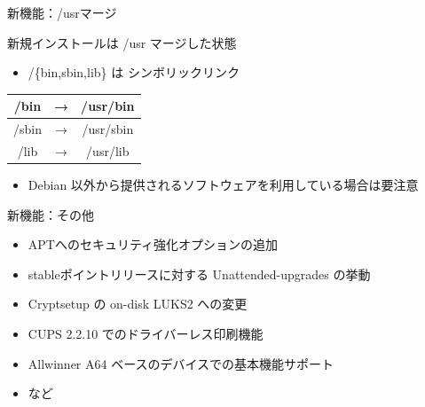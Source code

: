 \begin{frame}{新機能：/usrマージ}

新規インストールは /usr マージした状態

\begin{itemize}
  \item /\{bin,sbin,lib\} は シンボリックリンク
\end{itemize}

\begin{table}[htb]
  \begin{tabular}{|ccc|}
    \hline
    /bin  & → & /usr/bin \\ \hline
    /sbin & → & /usr/sbin \\ \hline
    /lib  & → & /usr/lib \\
    \hline
  \end{tabular}
\end{table}

\begin{itemize}
\item Debian 以外から提供されるソフトウェアを利用している場合は要注意
\end{itemize}

\end{frame}


\begin{frame}{新機能：その他}%

\begin{itemize}
\item APTへのセキュリティ強化オプションの追加
\item stableポイントリリースに対する Unattended-upgrades の挙動
\item Cryptsetup の on-disk LUKS2 への変更
\item CUPS 2.2.10 でのドライバーレス印刷機能
\item Allwinner A64 ベースのデバイスでの基本機能サポート
\item など
\end{itemize}

\end{frame}


